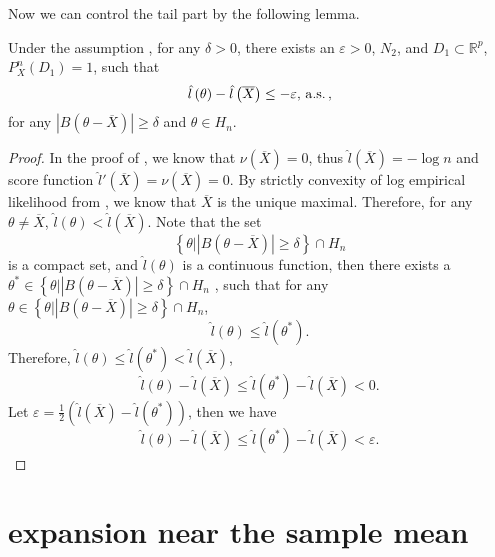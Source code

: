 Now we can control the tail part by the following lemma.
\begin{lem}
\label{lem:exponential-decay-tail}Under the assumption ,
for any $\delta>0$, there exists an $\varepsilon>0$, $N_{2}$, and
$D_{1}\subset\mathbb{R}^{p}$, $P_{X}^{n}\left(D_{1}\right)=1$, such
that 
\[
\hat{l}\left(\theta\right)-\hat{l}\left(\overline{X}\right)\le-\varepsilon,\,\mathrm{a.s.}\,,
\]
for any $\left|B\left(\theta-\overline{X}\right)\right|\ge\delta$
and $\theta\in H_{n}$. \end{lem}
\begin{proof}
In the proof of , we know that $\nu\left(\overline{X}\right)=0$,
thus $\hat{l}\left(\overline{X}\right)=-\log n$ and score function
$\hat{l}'\left(\overline{X}\right)=\nu\left(\overline{X}\right)=0$.
By strictly convexity of log empirical likelihood from ,
we know that $\overline{X}$ is the unique maximal. Therefore, for
any $\theta\neq\overline{X}$, $\hat{l}\left(\theta\right)<\hat{l}\left(\overline{X}\right)$.
Note that the set 
\[
\left\{ \theta|\left|B\left(\theta-\overline{X}\right)\right|\ge\delta\right\} \cap H_{n}
\]
is a compact set, and $\hat{l}\left(\theta\right)$ is a continuous
function, then there exists a $\theta^{*}\in\left\{ \theta|\left|B\left(\theta-\overline{X}\right)\right|\ge\delta\right\} \cap H_{n}$
, such that for any $\theta\in\left\{ \theta|\left|B\left(\theta-\overline{X}\right)\right|\ge\delta\right\} \cap H_{n}$,
\[
\hat{l}\left(\theta\right)\le\hat{l}\left(\theta^{*}\right).
\]
Therefore, $\hat{l}\left(\theta\right)\le\hat{l}\left(\theta^{*}\right)<\hat{l}\left(\overline{X}\right)$,
\[
\hat{l}\left(\theta\right)-\hat{l}\left(\overline{X}\right)\le\hat{l}\left(\theta^{*}\right)-\hat{l}\left(\overline{X}\right)<0.
\]
Let $\varepsilon=\frac{1}{2}\left(\hat{l}\left(\overline{X}\right)-\hat{l}\left(\theta^{*}\right)\right)$,
then we have 
\[
\hat{l}\left(\theta\right)-\hat{l}\left(\overline{X}\right)\le\hat{l}\left(\theta^{*}\right)-\hat{l}\left(\overline{X}\right)<\varepsilon.
\]

\end{proof}

\section{expansion near the sample mean}

